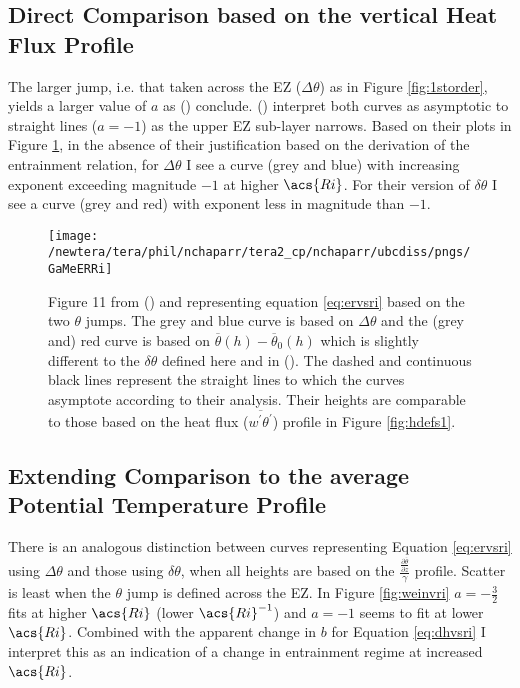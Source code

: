 \subsection{Direct Comparison based on the vertical Heat Flux Profile}
The larger jump, i.e. that taken across the \acs{EZ} ($\Delta \theta$) as in Figure \ref{fig:1storder}, yields a larger value of $a$ as \citeauthor{FedConzMir04} (\citeyear{FedConzMir04}) conclude.  \citeauthor{GarciaMellado} (\citeyear{GarciaMellado}) interpret both curves as asymptotic to straight lines ($a=-1$) as the upper \acs{EZ} sub-layer narrows. Based on their plots in Figure \ref{fig:GarcMelERRi}, in the absence of their justification based on the derivation of the entrainment relation, for $\Delta \theta$ I see a curve (grey and blue) with increasing exponent exceeding magnitude $-1$ at higher $\acs{Ri}$.  For their version of $\delta \theta$ I see a curve (grey and red) with exponent less in magnitude than $-1$.\\

\begin{figure}[htbp]
    \centering
    \texttt{[image: /newtera/tera/phil/nchaparr/tera2\_cp/nchaparr/ubcdiss/pngs/GaMeERRi]}
    \caption[Plots of scaled entrainment rate vs Richardson number from \citeauthor{GarciaMellado} (\citeyear{GarciaMellado})]{Figure 11 from \citeauthor{GarciaMellado} (\citeyear{GarciaMellado}) and representing equation \ref{eq:ervsri} based on the two $\theta$ jumps.  The grey and blue curve is based on $\Delta \theta$ and the (grey and) red curve is based on $\overline{\theta}(h) - \overline{\theta}_{0}(h)$ which is slightly different to the $\delta \theta$ defined here and in \citeauthor{FedConzMir04} (\citeyear{FedConzMir04}). The dashed and continuous black lines represent the straight lines to which the curves asymptote according to their analysis. Their heights are comparable to those based on the heat flux ($\overline{w^{'}\theta^{'}}$) profile in Figure \ref{fig:hdefs1}.}
    \label{fig:GarcMelERRi}   %
\end{figure}

\subsection{Extending Comparison to the average Potential Temperature Profile}

There is an analogous distinction between curves representing Equation \ref{eq:ervsri} using $\Delta \theta$ and those using $\delta \theta$, when all heights are based on the $\frac{\frac{\partial \overline{\theta}}{\partial z}}{\gamma}$ profile.  Scatter is least when the $\theta$ jump is defined across the \acs{EZ}.  In Figure \ref{fig:weinvri} $a=-\frac{3}{2}$ fits at higher $\acs{Ri}$ (lower $\acs{Ri}^{-1}$) and $a=-1$ seems to fit at lower $\acs{Ri}$.  Combined with the apparent change in $b$ for Equation \ref{eq:dhvsri} I interpret this as an indication of a change in entrainment regime at increased $\acs{Ri}$.\\ 

